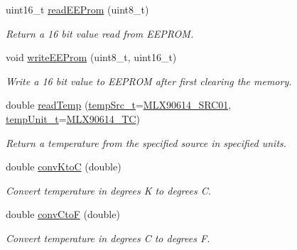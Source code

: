 \begin{DoxyCompactItemize}
uint16\-\_\-t \hyperlink{class_m_l_x90614_aab0a010875527f4ac3d2794017624b10}{read\-E\-E\-Prom} (uint8\-\_\-t)
\begin{DoxyCompactList}\small\item\em Return a 16 bit value read from E\-E\-P\-R\-O\-M. \end{DoxyCompactList}\item 
void \hyperlink{class_m_l_x90614_a70b3e428c623b6af5bedf199f5c16490}{write\-E\-E\-Prom} (uint8\-\_\-t, uint16\-\_\-t)
\begin{DoxyCompactList}\small\item\em Write a 16 bit value to E\-E\-P\-R\-O\-M after first clearing the memory. \end{DoxyCompactList}\item 
double \hyperlink{class_m_l_x90614_ab2a8bafff744a249325105d238bfe248}{read\-Temp} (\hyperlink{class_m_l_x90614_a500f8c49b00e725d5c201092d9c02b8b}{temp\-Src\-\_\-t}=\hyperlink{class_m_l_x90614_a500f8c49b00e725d5c201092d9c02b8ba91f620721ea47dec379db791d735a55b}{M\-L\-X90614\-\_\-\-S\-R\-C01}, \hyperlink{class_m_l_x90614_a18769519e647d93c959566b81d2e514f}{temp\-Unit\-\_\-t}=\hyperlink{class_m_l_x90614_a18769519e647d93c959566b81d2e514fa75d66a29cab65ff4514b5cd6a268c7bf}{M\-L\-X90614\-\_\-\-T\-C})
\begin{DoxyCompactList}\small\item\em Return a temperature from the specified source in specified units. \end{DoxyCompactList}\item 
double \hyperlink{class_m_l_x90614_af0a52019a3c66f0ae3b954a4e7475c88}{conv\-Kto\-C} (double)
\begin{DoxyCompactList}\small\item\em Convert temperature in degrees K to degrees C. \end{DoxyCompactList}\item 
double \hyperlink{class_m_l_x90614_a2a5b34da155086b85fb74ceb7310b2cb}{conv\-Cto\-F} (double)
\begin{DoxyCompactList}\small\item\em Convert temperature in degrees C to degrees F. \end{DoxyCompactList}\end{DoxyCompactItemize}
